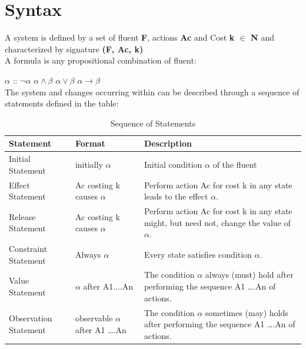 \documentclass[11pt]{article}
\begin{document}
	\section{Syntax}\label{sec:syntax}
	A system is defined by a set of fluent {\bfseries F}, actions {\bfseries Ac} and Cost {\bfseries k \(\in\) N} and characterized by signature {\bfseries(F, Ac, k)}\\
	A formula is any propositional combination of fluent:
	
	$\alpha$ :: $\neg\alpha$ \textbar $\alpha\wedge\beta$ \textbar $\alpha\vee\beta$ \textbar $\alpha\rightarrow\beta$\\ 
	The system and changes occurring within can be described through a sequence of statements defined in the table:
	\begin{table}[h]
		\centering
			\begin{tabular}{|p{2cm}|p{3cm}|p{8cm}|}
				\hline
				\bfseries Statement & \bfseries Format & \bfseries Description\\
				\hline
				Initial Statement & initially \(\alpha\) & Initial condition \(\alpha\) of the fluent \\
				\hline
				Effect Statement & Ac costing k causes \(\alpha\) & Perform action Ac for cost k in any state leads to the effect \(\alpha\).\\
				\hline	
				Release Statement & Ac costing k causes \(\alpha\) & Perform action Ac for cost k in any state might, but need not, change the value of \(\alpha\).\\
				\hline
				Constraint Statement & Always \(\alpha\) & Every state satisfies condition \(\alpha\).\\
				\hline
				Value Statement & \(\alpha\) after A1....An & The condition \(\alpha\) always (must) hold after performing the sequence A1 ….An of actions.\\
				\hline
				Observation Statement & observable \(\alpha\) after A1 ….An & The condition \(\alpha\) sometimes (may) holds after performing the sequence A1 ….An of actions.\\
				\hline
			\end{tabular}
		\caption{Sequence of Statements}
		\label{tab:table01}
	\end{table}
\end{document}
